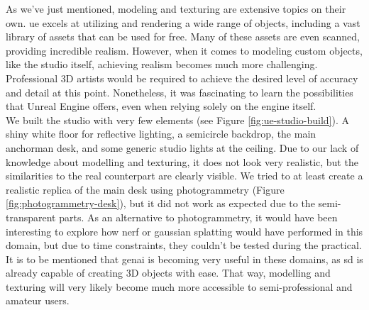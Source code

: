 \documentclass[
  a4paper,  %
  twoside,  %
  bibliography=totoc,
  headsepline,
  cleardoublepage=empty,
  parskip=half,
  draft=false
]{scrbook}
\begin{document}
As we've just mentioned, modeling and texturing are extensive topics on their own. \gls{ue} excels at utilizing and rendering a wide range of objects, including a vast library of assets that can be used for free. Many of these assets are even scanned, providing incredible realism. However, when it comes to modeling custom objects, like the studio itself, achieving realism becomes much more challenging. Professional 3D artists would be required to achieve the desired level of accuracy and detail at this point. Nonetheless, it was fascinating to learn the possibilities that Unreal Engine offers, even when relying solely on the engine itself. \\
We built the studio with very few elements (see Figure \ref{fig:ue-studio-build}). A shiny white floor for reflective lighting, a semicircle backdrop, the main anchorman desk, and some generic studio lights at the ceiling. Due to our lack of knowledge about modelling and texturing, it does not look very realistic, but the similarities to the real counterpart are clearly visible. We tried to at least create a realistic replica of the main desk using photogrammetry (Figure \ref{fig:photogrammetry-desk}), but it did not work as expected due to the semi-transparent parts. As an alternative to photogrammetry, it would have been interesting to explore how \gls{nerf} or gaussian splatting would have performed in this domain, but due to time constraints, they couldn't be tested during the practical. \\
It is to be mentioned that \gls{genai} is becoming very useful in these domains, as \gls{sd} is already capable of creating 3D objects with ease. That way, modelling and texturing will very likely become much more accessible to semi-professional and amateur users.
\end{document}
